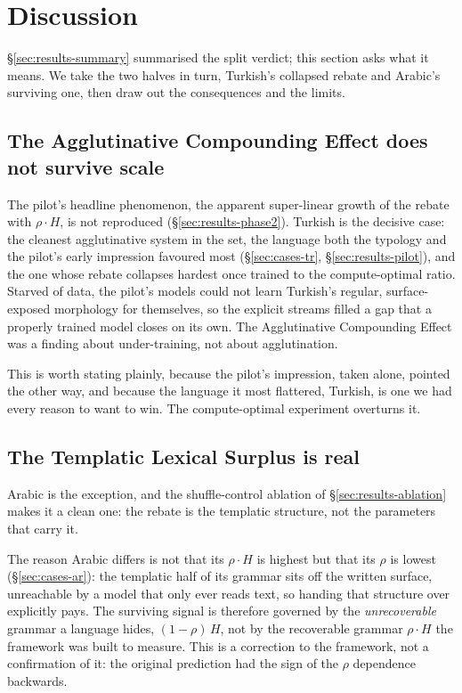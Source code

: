 \section{Discussion}
\label{sec:discussion}

\S\ref{sec:results-summary} summarised the split verdict; this section asks what it means. We take the two halves in turn, Turkish's collapsed rebate and Arabic's surviving one, then draw out the consequences and the limits.

\subsection{The Agglutinative Compounding Effect does not survive scale}
\label{sec:discussion-ace}

The pilot's headline phenomenon, the apparent super-linear growth of the rebate with $\rho \cdot H$, is not reproduced (\S\ref{sec:results-phase2}). Turkish is the decisive case: the cleanest agglutinative system in the set, the language both the typology and the pilot's early impression favoured most (\S\ref{sec:cases-tr}, \S\ref{sec:results-pilot}), and the one whose rebate collapses hardest once trained to the compute-optimal ratio. Starved of data, the pilot's models could not learn Turkish's regular, surface-exposed morphology for themselves, so the explicit streams filled a gap that a properly trained model closes on its own. The Agglutinative Compounding Effect was a finding about under-training, not about agglutination.

This is worth stating plainly, because the pilot's impression, taken alone, pointed the other way, and because the language it most flattered, Turkish, is one we had every reason to want to win. The compute-optimal experiment overturns it.

\subsection{The Templatic Lexical Surplus is real}
\label{sec:discussion-tls}

Arabic is the exception, and the shuffle-control ablation of \S\ref{sec:results-ablation} makes it a clean one: the rebate is the templatic structure, not the parameters that carry it.

The reason Arabic differs is not that its $\rho \cdot H$ is highest but that its $\rho$ is lowest (\S\ref{sec:cases-ar}): the templatic half of its grammar sits off the written surface, unreachable by a model that only ever reads text, so handing that structure over explicitly pays. The surviving signal is therefore governed by the \emph{unrecoverable} grammar a language hides, $(1-\rho)\,H$, not by the recoverable grammar $\rho \cdot H$ the framework was built to measure. This is a correction to the framework, not a confirmation of it: the original prediction had the sign of the $\rho$ dependence backwards.


